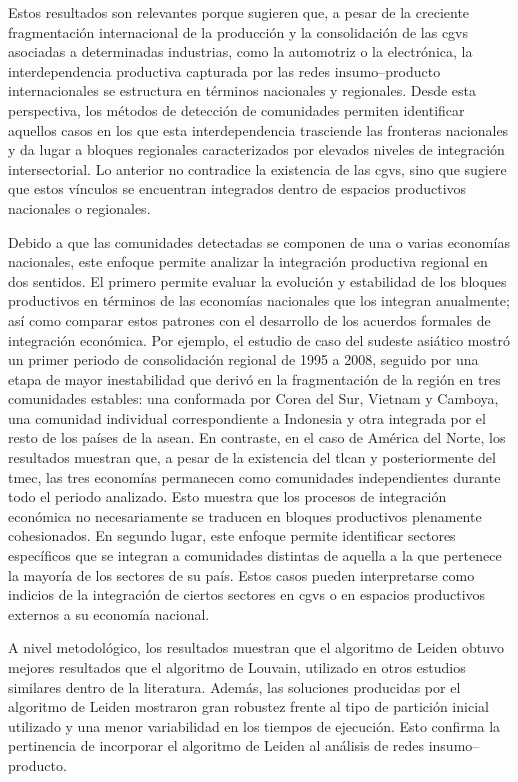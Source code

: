 Estos resultados son relevantes porque sugieren que, a pesar de la creciente fragmentación internacional de la producción y la consolidación de las \glspl{cgv} asociadas a determinadas industrias, como la automotriz o la electrónica, la interdependencia productiva capturada por las redes insumo--producto internacionales se estructura en términos nacionales y regionales. Desde esta perspectiva, los métodos de detección de comunidades permiten identificar aquellos casos en los que esta interdependencia trasciende las fronteras nacionales y da lugar a bloques regionales caracterizados por elevados niveles de integración intersectorial. Lo anterior no contradice la existencia de las \glspl{cgv}, sino que sugiere que estos vínculos se encuentran integrados dentro de espacios productivos nacionales o regionales.

Debido a que las comunidades detectadas se componen de una o varias economías nacionales, este enfoque permite analizar la integración productiva regional en dos sentidos. El primero permite evaluar la evolución y estabilidad de los bloques productivos en términos de las economías nacionales que los integran anualmente; así como comparar estos patrones con el desarrollo de los acuerdos formales de integración económica. Por ejemplo, el estudio de caso del sudeste asiático mostró un primer periodo de consolidación regional de 1995 a 2008, seguido por una etapa de mayor inestabilidad que derivó en la fragmentación de la región en tres comunidades estables: una conformada por Corea del Sur, Vietnam y Camboya, una comunidad individual correspondiente a Indonesia y otra integrada por el resto de los países de la \gls{asean}. En contraste, en el caso de América del Norte, los resultados muestran que, a pesar de la existencia del \gls{tlcan} y posteriormente del \gls{tmec}, las tres economías permanecen como comunidades independientes durante todo el periodo analizado. Esto muestra que los procesos de integración económica no necesariamente se traducen en bloques productivos plenamente cohesionados. En segundo lugar, este enfoque permite identificar sectores específicos que se integran a comunidades distintas de aquella a la que pertenece la mayoría de los sectores de su país. Estos casos pueden interpretarse como indicios de la integración de ciertos sectores en \glspl{cgv} o en espacios productivos externos a su economía nacional.

A nivel metodológico, los resultados muestran que el algoritmo de Leiden obtuvo mejores resultados que el algoritmo de Louvain, utilizado en otros estudios similares dentro de la literatura. Además, las soluciones producidas por el algoritmo de Leiden mostraron gran robustez frente al tipo de partición inicial utilizado y una menor variabilidad en los tiempos de ejecución. Esto confirma la pertinencia de incorporar el algoritmo de Leiden al análisis de redes insumo--producto.


